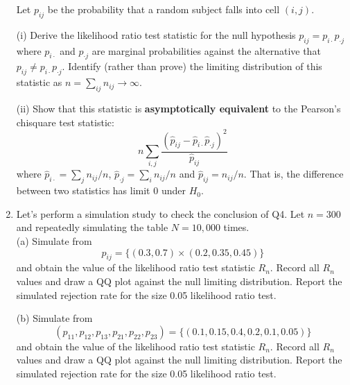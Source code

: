 \begin{enumerate}
Let $p_{ij}$ be the probability that a random subject falls into cell $(i, j)$.

(i) Derive the likelihood ratio test statistic for the null hypothesis 
$p_{ij} = p_{i\cdot}p_{\cdot j}$
where $p_{i\cdot}$ and $p_{\cdot j}$ are marginal probabilities 
against the alternative that $ p_{ij} \neq p_{i\cdot}p_{\cdot j} $.
Identify (rather than prove) the limiting distribution of this statistic as $n = \sum_{ij} n_{ij} \to \infty$.

(ii) Show that this statistic is {\bf asymptotically equivalent}
 to the Pearson's chisquare test statistic:
\[
n \sum_{i, j}  \frac{ (\hat p_{ij} - \hat p_{i\cdot}\hat p_{\cdot j})^2}{\hat p_{ij}}
\]
where $ \hat{p}_{i\cdot} = \sum_j n_{ij}/n  $, $ \hat{p}_{\cdot j} = \sum_i n_{ij}/n  $ and
$ \hat{p}_{i j} = n_{ij}/n  $. That is, the difference between two statistics has limit $0$ under $ H_0 $.  
  
 \item 
 Let's perform a simulation study to check the conclusion of Q4. 
 Let $ n=300 $ and repeatedly simulating the table $ N=10,000 $ times. \\

(a) Simulate from 
$$
p_{ij} = \{ (0.3, 0.7) \times (0.2, 0.35, 0.45) \}
$$    
and obtain the value of the likelihood ratio test statistic $ R_n $. 
Record all $ R_n $ values and draw a QQ plot against the null limiting distribution. 
Report the simulated rejection rate for the size 0.05 likelihood ratio test. 

(b)  Simulate from 
$$
(p_{11}, p_{12}, p_{13}, p_{21}, p_{22}, p_{23})  = \{ (0.1, 0.15, 0.4, 0.2, 0.1, 0.05) \}
$$    
and obtain the value of the likelihood ratio test statistic $ R_n $. 
Record all $ R_n $ values and draw a QQ plot against the null limiting distribution. 
Report the simulated rejection rate for the size 0.05 likelihood ratio test. \\



\end{enumerate}

